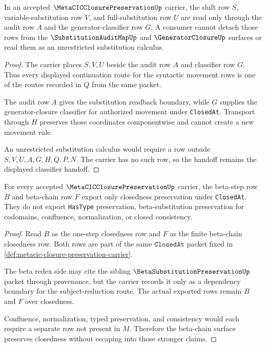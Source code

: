 \begin{theorem}
\label{thm:metacic-closure-preservation-shift-substitution-classifier}
In an accepted $\MetaCICClosurePreservationUp$ carrier, the shift row $S$, variable-substitution row $V$, and full-substitution row $U$ are read only through the audit row $A$ and the generator-classifier row $G$. A consumer cannot detach those rows from the $\SubstitutionAuditMapUp$ and $\GeneratorClosureUp$ surfaces or read them as an unrestricted substitution calculus.
\end{theorem}
\begin{proof}
The carrier places $S,V,U$ beside the audit row $A$ and classifier row $G$. Thus every displayed continuation route for the syntactic movement rows is one of the routes recorded in $Q$ from the same packet.

The audit row $A$ gives the substitution readback boundary, while $G$ supplies the generator-closure classifier for authorized movement under \texttt{ClosedAt}. Transport through $H$ preserves those coordinates componentwise and cannot create a new movement rule.

An unrestricted substitution calculus would require a row outside $S,V,U,A,G,H,Q,P,N$. The carrier has no such row, so the handoff remains the displayed classifier handoff.
\end{proof}

\begin{theorem}
\label{thm:metacic-closure-preservation-beta-chain-nonescape}
For every accepted $\MetaCICClosurePreservationUp$ carrier, the beta-step row $B$ and beta-chain row $F$ export only closedness preservation under \texttt{ClosedAt}. They do not export \texttt{HasType} preservation, beta-substitution preservation for codomains, confluence, normalization, or closed consistency.
\end{theorem}
\begin{proof}
Read $B$ as the one-step closedness row and $F$ as the finite beta-chain closedness row. Both rows are part of the same $\texttt{ClosedAt}$ packet fixed in \autoref{def:metacic-closure-preservation-carrier}.

The beta redex side may cite the sibling $\BetaSubstitutionPreservationUp$ packet through provenance, but the carrier records it only as a dependency boundary for the subject-reduction route. The actual exported rows remain $B$ and $F$ over closedness.

Confluence, normalization, typed preservation, and consistency would each require a separate row not present in $M$. Therefore the beta-chain surface preserves closedness without escaping into those stronger claims.
\end{proof}

